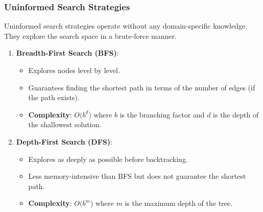 \documentclass[aspectratio=169]{beamer}
\begin{document}
\begin{frame}[fragile]
    \frametitle{Uninformed Search Strategies}
    
    Uninformed search strategies operate without any domain-specific knowledge. They explore the search space in a brute-force manner.
    
    \begin{enumerate}
        \item \textbf{Breadth-First Search (BFS)}:
            \begin{itemize}
                \item Explores nodes level by level.
                \item Guarantees finding the shortest path in terms of the number of edges (if the path exists).
                \item \textbf{Complexity}: $O(b^d$) where $b$ is the branching factor and $d$ is the depth of the shallowest solution.
            \end{itemize}
        \item \textbf{Depth-First Search (DFS)}:
            \begin{itemize}
                \item Explores as deeply as possible before backtracking.
                \item Less memory-intensive than BFS but does not guarantee the shortest path.
                \item \textbf{Complexity}: $O(b^m$) where $m$ is the maximum depth of the tree.
            \end{itemize}
    \end{enumerate}
\end{frame}
\end{document}
